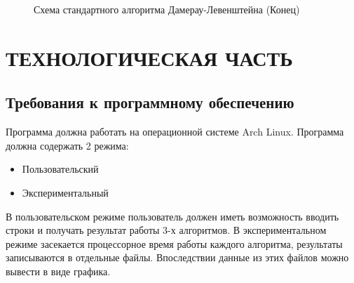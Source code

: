 \documentclass[a4paper,12pt]{article}
\begin{document}
\begin{figure}[p]
\caption{Схема стандартного алгоритма Дамерау-Левенштейна (Конец)}
\label{images:damerau_levenstein2}
\end{figure}\newpage
\section{ТЕХНОЛОГИЧЕСКАЯ ЧАСТЬ}
\subsection{Требования к программному обеспечению}

\begin{flushleft}
Программа должна работать на операционной системе Arch Linux. Программа должна
содержать 2 режима:
\begin{itemize}
\item Пользовательский
\item Экспериментальный
\end{itemize}
В пользовательском режиме пользователь должен иметь возможность вводить строки и получать результат работы 3-х алгоритмов. В экспериментальном режиме засекается процессорное время работы каждого алгоритма, результаты записываются в отдельные файлы. Впоследствии данные из этих файлов можно вывести в виде графика.
\end{flushleft}
\end{document}

